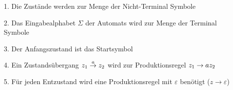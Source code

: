 \begin{itemize}
    \item[1.] Die Zustände werden zur Menge der Nicht-Terminal Symbole
    \item[2.] Das Eingabealphabet $\Sigma$ der Automats wird zur Menge der Terminal Symbole
    \item[3.] Der Anfangszustand ist das Startsymbol
    \item[4.] Ein Zustandsübergang \large$z_1 \overset{a}{\rightarrow} z_2 \mkern7mu$\normalsize wird zur Produktionsregel \large$z_1 \rightarrow az_2\normalsize$\normalsize
    \item[5.] Für jeden Entzustand wird eine Produktionsregel mit $\varepsilon$ benötigt (\large$z \rightarrow \varepsilon$\normalsize) 
\end{itemize}
